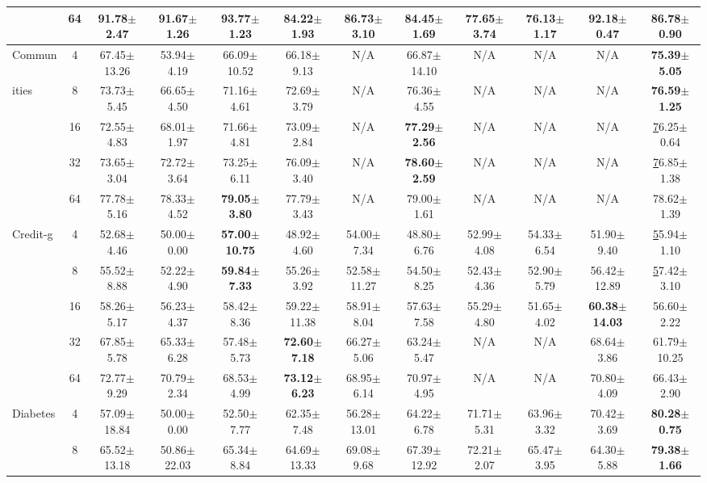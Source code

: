 \documentclass{article}
\theoremstyle{plain}
\theoremstyle{definition}
\theoremstyle{remark}
\begin{document}
\begin{table}[h!]
{\begin{tabular}{@{}lccccccccccc@{}}
 & 64 & 91.78$\pm$2.47 & 91.67$\pm$1.26 & \textbf{93.77$\pm$1.23} & 84.22$\pm$1.93 & 86.73$\pm$3.10 & 84.45$\pm$1.69 & 77.65$\pm$3.74 & 76.13$\pm$1.17 & 92.18$\pm$0.47 & 86.78$\pm$0.90 \\ \hline
Commun & 4 & 67.45$\pm$13.26 & 53.94$\pm$4.19 & 66.09$\pm$10.52 & 66.18$\pm$9.13 & N/A & 66.87$\pm$14.10 & N/A & N/A & N/A & \textbf{75.39$\pm$5.05} \\
ities & 8 & 73.73$\pm$5.45 & 66.65$\pm$4.50 & 71.16$\pm$4.61 & 72.69$\pm$3.79 & N/A & 76.36$\pm$4.55 & N/A & N/A & N/A & \textbf{76.59$\pm$1.25} \\
 & 16 & 72.55$\pm$4.83 & 68.01$\pm$1.97 & 71.66$\pm$4.81 & 73.09$\pm$2.84 & N/A & \textbf{77.29$\pm$2.56} & N/A & N/A & N/A & {\ul 76.25$\pm$0.64} \\
 & 32 & 73.65$\pm$3.04 & 72.72$\pm$3.64 & 73.25$\pm$6.11 & 76.09$\pm$3.40 & N/A & \textbf{78.60$\pm$2.59} & N/A & N/A & N/A & {\ul 76.85$\pm$1.38} \\
 & 64 & 77.78$\pm$5.16 & 78.33$\pm$4.52 & \textbf{79.05$\pm$3.80} & 77.79$\pm$3.43 & N/A & 79.00$\pm$1.61 & N/A & N/A & N/A & 78.62$\pm$1.39 \\ \hline
Credit-g & 4 & 52.68$\pm$4.46 & 50.00$\pm$0.00 & \textbf{57.00$\pm$10.75} & 48.92$\pm$4.60 & 54.00$\pm$7.34 & 48.80$\pm$6.76 & 52.99$\pm$4.08 & 54.33$\pm$6.54 & 51.90$\pm$9.40 & {\ul 55.94$\pm$1.10} \\
 & 8 & 55.52$\pm$8.88 & 52.22$\pm$4.90 & \textbf{59.84$\pm$7.33} & 55.26$\pm$3.92 & 52.58$\pm$11.27 & 54.50$\pm$8.25 & 52.43$\pm$4.36 & 52.90$\pm$5.79 & 56.42$\pm$12.89 & {\ul 57.42$\pm$3.10} \\
 & 16 & 58.26$\pm$5.17 & 56.23$\pm$4.37 & 58.42$\pm$8.36 & 59.22$\pm$11.38 & 58.91$\pm$8.04 & 57.63$\pm$7.58 & 55.29$\pm$4.80 & 51.65$\pm$4.02 & \textbf{60.38$\pm$14.03} & 56.60$\pm$2.22 \\
 & 32 & 67.85$\pm$5.78 & 65.33$\pm$6.28 & 57.48$\pm$5.73 & \textbf{72.60$\pm$7.18} & 66.27$\pm$5.06 & 63.24$\pm$5.47 & N/A & N/A & 68.64$\pm$3.86 & 61.79$\pm$10.25 \\
 & 64 & 72.77$\pm$9.29 & 70.79$\pm$2.34 & 68.53$\pm$4.99 & \textbf{73.12$\pm$6.23} & 68.95$\pm$6.14 & 70.97$\pm$4.95 & N/A & N/A & 70.80$\pm$4.09 & 66.43$\pm$2.90 \\ \hline
Diabetes & 4 & 57.09$\pm$18.84 & 50.00$\pm$0.00 & 52.50$\pm$7.77 & 62.35$\pm$7.48 & 56.28$\pm$13.01 & 64.22$\pm$6.78 & 71.71$\pm$5.31 & 63.96$\pm$3.32 & 70.42$\pm$3.69 & \textbf{80.28$\pm$0.75} \\
 & 8 & 65.52$\pm$13.18 & 50.86$\pm$22.03 & 65.34$\pm$8.84 & 64.69$\pm$13.33 & 69.08$\pm$9.68 & 67.39$\pm$12.92 & 72.21$\pm$2.07 & 65.47$\pm$3.95 & 64.30$\pm$5.88 & \textbf{79.38$\pm$1.66} \\

\end{tabular}}
\end{table}
\end{document}
